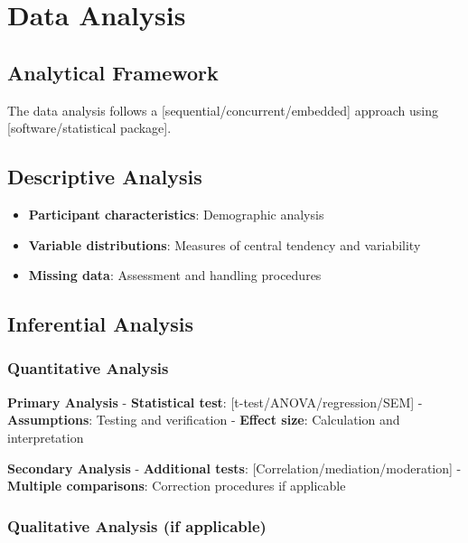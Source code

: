 \documentclass[
  12pt,
  letterpaper,
  12pt,
  letterpaper,
  oneside]{report}
\providecommand{\tightlist}{%
  \setlength{\itemsep}{0pt}\setlength{\parskip}{0pt}}
\begin{document}
\section{Data Analysis}\label{data-analysis}

\subsection{Analytical Framework}\label{analytical-framework}

The data analysis follows a {[}sequential/concurrent/embedded{]}
approach using {[}software/statistical package{]}.

\subsection{Descriptive Analysis}\label{descriptive-analysis}

\begin{itemize}
\tightlist
\item
  \textbf{Participant characteristics}: Demographic analysis
\item
  \textbf{Variable distributions}: Measures of central tendency and
  variability
\item
  \textbf{Missing data}: Assessment and handling procedures
\end{itemize}

\subsection{Inferential Analysis}\label{inferential-analysis}

\subsubsection{Quantitative Analysis}\label{quantitative-analysis}

\textbf{Primary Analysis} - \textbf{Statistical test}:
{[}t-test/ANOVA/regression/SEM{]} - \textbf{Assumptions}: Testing and
verification - \textbf{Effect size}: Calculation and interpretation

\textbf{Secondary Analysis} - \textbf{Additional tests}:
{[}Correlation/mediation/moderation{]} - \textbf{Multiple comparisons}:
Correction procedures if applicable

\subsubsection{Qualitative Analysis (if
applicable)}\label{qualitative-analysis-if-applicable}
\end{document}
